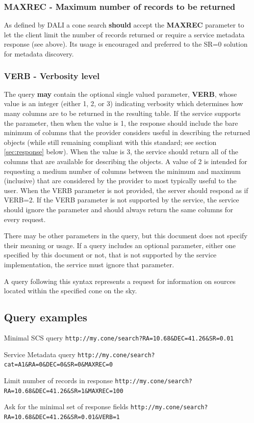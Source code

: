 \documentclass[11pt,a4paper]{ivoa}
\begin{document}
\subsubsection{MAXREC - Maximum number of records to be returned}
As defined by DALI a cone search \textbf{should} accept the \textbf{MAXREC} parameter to let the client limit the number of records returned or require a service metadata response (see above).  Its usage is encouraged and preferred to the SR=0 solution for metadata discovery.

\subsubsection{VERB - Verbosity level}
The query \textbf{may} contain the optional single valued parameter, \textbf{VERB}, whose value is an integer (either 1, 2, or 3) indicating verbosity which determines how many columns are to be returned in the resulting table. If the service supports the parameter, then when the value is 1, the response should include the bare minimum of columns that the provider considers useful in describing the returned objects (while still remaining compliant with this standard; see section \ref{sec:response} below). When the value is 3, the service should return all of the columns that are available for describing the objects. A value of 2 is intended for requesting a medium number of columns between the minimum and maximum (inclusive) that are considered by the provider to most typically useful to the user. When the VERB parameter is not provided, the server should respond as if VERB=2. If the VERB parameter is not supported by the service, the service should ignore the parameter and should always return the same columns for every request.

There may be other parameters in the query, but this document does not specify their meaning or usage. If a query includes an optional parameter, either one specified by this document or not, that is not supported by the service implementation, the service must ignore that parameter.

A query following this syntax represents a request for information on sources located within the specified cone on the sky.

\subsection{Query examples}
\begin{bigdescription}
\item[Minimal SCS query] \texttt{http://my.cone/search?RA=10.68\&DEC=41.26\&SR=0.01}
\item[Service Metadata query] \texttt{http://my.cone/search?cat=A1\&RA=0\&DEC=0\&SR=0\&MAXREC=0}
\item[Limit number of records in response] \texttt{http://my.cone/search?RA=10.68\&DEC=41.26\&SR=1\&MAXREC=100}
\item[Ask for the minimal set of response fields] \texttt{http://my.cone/search?RA=10.68\&DEC=41.26\&SR=0.01\&VERB=1}
\end{bigdescription}
\end{document}
